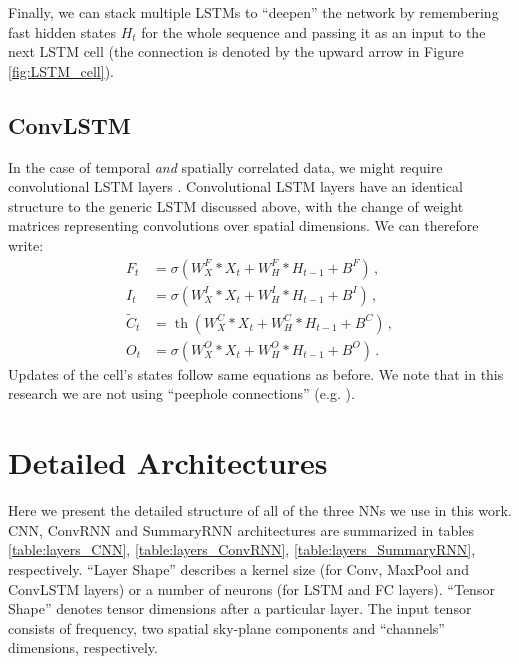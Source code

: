 \documentclass[fleqn,usenatbib]{mnras}
\begin{document}
Finally, we can stack multiple LSTMs to \enquote{deepen} the network by remembering fast hidden states $H_t$ for the whole sequence and passing it as an input to the next LSTM cell (the connection is denoted by the upward arrow in Figure \ref{fig:LSTM_cell}). 

\subsection{ConvLSTM} \label{app:ConvLSTM}
In the case of temporal \textit{and} spatially correlated data, we might require convolutional LSTM layers \citep{ConvLSTM}. Convolutional LSTM layers have an identical structure to the generic LSTM discussed above, with the change of weight matrices representing convolutions over spatial dimensions. We can therefore write:
\begin{equation}
\begin{aligned}
F_{t} &=\sigma (W^{F}_X * X_{t} + W^F_H * H_{t-1} + B^F) \, , \\
I_{t} &=\sigma(W^{I}_X * X_t + W^I_H * H_{t-1} + B^I )  \, ,\\
\widetilde{C}_{t} &=\operatorname{th} (W^{C}_X * X_t + W^C_H * H_{t-1} + B^{C} )  \, ,\\
O_{t} &=\sigma(W^{O}_X * X_t + W^O_H * H_{t-1}+ B^O)  \, .
\end{aligned}
\end{equation}
Updates of the cell's states follow same equations as before. We note that in this research we are not using \enquote{peephole connections} (e.g. \citealt{ConvLSTM}).

\section{Detailed Architectures} \label{app:DetailedArchitectures}
Here we present the detailed structure of all of the three NNs we use in this work. 
CNN, ConvRNN and SummaryRNN architectures are summarized in tables \ref{table:layers_CNN}, \ref{table:layers_ConvRNN}, \ref{table:layers_SummaryRNN}, respectively. 
\enquote{Layer Shape} describes a kernel size (for Conv, MaxPool and ConvLSTM layers) or a number of neurons (for LSTM and FC layers).
\enquote{Tensor Shape} denotes tensor dimensions after a particular layer. The input tensor consists of frequency, two spatial sky-plane components and \enquote{channels} dimensions, respectively.
\end{document}
